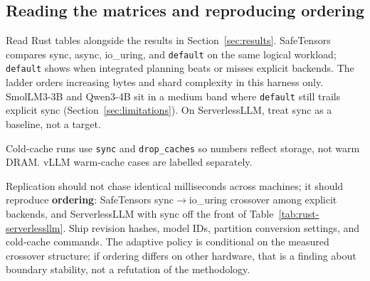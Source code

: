 \subsection{Reading the matrices and reproducing ordering}

Read Rust tables alongside the results in Section~\ref{sec:results}. SafeTensors compares sync, async, io\_uring, and \texttt{default} on the same logical workload; \texttt{default} shows when integrated planning beats or misses explicit backends. The ladder orders increasing bytes and shard complexity in this harness only. SmolLM3-3B and Qwen3-4B sit in a medium band where \texttt{default} still trails explicit sync (Section~\ref{sec:limitations}). On ServerlessLLM, treat sync as a baseline, not a target.

Cold-cache runs use \texttt{sync} and \texttt{drop\_caches} so numbers reflect storage, not warm DRAM. vLLM warm-cache cases are labelled separately.

Replication should not chase identical milliseconds across machines; it should reproduce \textbf{ordering}: SafeTensors sync$\rightarrow$io\_uring crossover among explicit backends, and ServerlessLLM with sync off the front of Table~\ref{tab:rust-serverlessllm}. Ship revision hashes, model IDs, partition conversion settings, and cold-cache commands. The adaptive policy is conditional on the measured crossover structure; if ordering differs on other hardware, that is a finding about boundary stability, not a refutation of the methodology.
